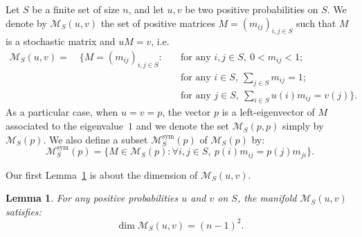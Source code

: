 \documentclass[10pt]{amsart}
\newtheorem{lemm}[theo]{Lemma}\newtheorem{prop}[theo]{Proposition}\newtheorem{coro}[theo]{Corollary}\newtheorem{conj}[theo]{Conjecture}
\theoremstyle{definition}\newtheorem{defi}[theo]{Definition}\newtheorem{rema}[theo]{Remark}\newtheorem{exam}[theo]{Example}\newtheorem{exem}[theo]{Example}\newtheorem{nota}[theo]{Notation}
\newcounter{a}
\DeclareMathOperator{\sym}{sym}
\let\oldforall\forall
\renewcommand*{\forall}{\mathrel{\oldforall}}
\begin{document}
Let $S$ be a finite set of size $n$, and let $u,v$ be two positive probabilities on $S$. We denote by $\mathcal{M}_S(u,v)$ the set of positive matrices $M = (m_{ij})_{i,j \in S}$ such that $M$ is a stochastic matrix and $uM=v$, i.e.
\begin{align*}
\mathcal{M}_S(u,v) = \quad \{ M = (m_{ij})_{i,j \in S} : & \quad \text{for any } i,j \in S,\ 0 < m_{ij} < 1;\\
& \quad \text{for any } i \in S,\ \sum_{j\in S} m_{ij} = 1;\\
& \quad \text{for any } j \in S,\ \sum_{i\in S} u(i) m_{ij} = v(j)\}.
\end{align*}
As a particular case, when $u=v=p$, the vector $p$ is a left-eigenvector of $M$ associated to the eigenvalue~$1$ and we denote the set $\mathcal{M}_S(p,p)$ simply by $\mathcal{M}_S(p)$. We also define a subset $\mathcal{M}^{\sym}_S(p)$ of $\mathcal{M}_S(p)$ by:
\begin{equation*}
\mathcal{M}^{\sym}_S(p) = \{ M \in \mathcal{M}_S(p) : \forall i,j \in S,\ p(i) m_{ij} = p(j) m_{ji}\}.
\end{equation*}

Our first Lemma~\ref{lem:dim-mp} is about the dimension of $\mathcal{M}_S(u,v)$.

\begin{lemm}\label{lem:dim-mp}
For any positive probabilities $u$ and $v$ on $S$, the manifold $\mathcal{M}_S(u,v)$ satisfies:
\begin{equation*}
\dim \mathcal{M}_S(u,v) = (n-1)^2.
\end{equation*}
\end{lemm}
\end{document}
